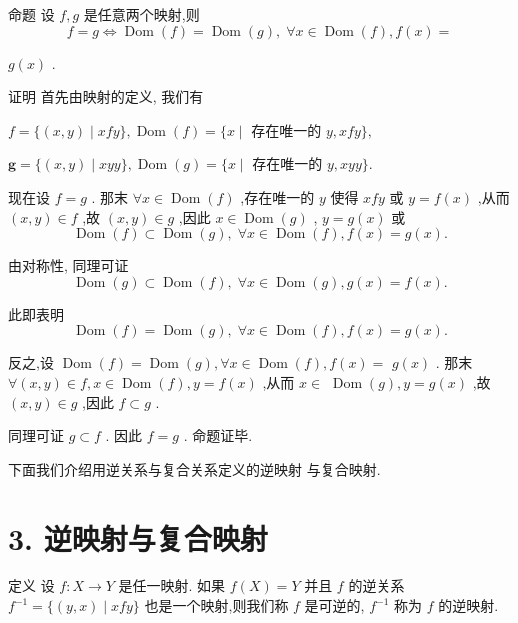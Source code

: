 命题 设 $f,g$ 是任意两个映射,则
$$f = g \Leftrightarrow  \operatorname{Dom}\left( f\right)  = \operatorname{Dom}\left( g\right) ,\;\forall x \in  \operatorname{Dom}\left( f\right) ,f\left( x\right)  =$$

$g\left( x\right)$ .

证明 首先由映射的定义, 我们有

$f = \{ \left( {x,y}\right)  \mid  {xfy}\} ,\operatorname{Dom}\left( f\right)  = \{ x \mid$ 存在唯一的 $y,{xfy}\} ,$

$\mathbf{g} = \{ \left( {x,y}\right)  \mid  {xyy}\} ,\operatorname{Dom}\left( g\right)  = \{ x \mid$ 存在唯一的 $y,{xyy}\} .$

现在设 $f = g$ . 那末 $\forall x \in  \operatorname{Dom}\left( f\right)$ ,存在唯一的 $y$ 使得 ${xfy}$ 或 $y = f\left( x\right)$ ,从而 $\left( {x,y}\right)  \in  f$ ,故 $\left( {x,y}\right)  \in  g$ ,因此 $x \in  \operatorname{Dom}\left( g\right)$ , $y = g\left( x\right)$ 或
$$\operatorname{Dom}\left( f\right)  \subset  \operatorname{Dom}\left( g\right) ,\;\forall x \in  \operatorname{Dom}\left( f\right) ,f\left( x\right)  = g\left( x\right) .$$

由对称性, 同理可证
$$\operatorname{Dom}\left( g\right)  \subset  \operatorname{Dom}\left( f\right) ,\;\forall x \in  \operatorname{Dom}\left( g\right) ,g\left( x\right)  = f\left( x\right) .$$

此即表明
$$\operatorname{Dom}\left( f\right)  = \operatorname{Dom}\left( g\right) ,\;\forall x \in  \operatorname{Dom}\left( f\right) ,f\left( x\right)  = g\left( x\right) .$$

反之,设 $\operatorname{Dom}\left( f\right)  = \operatorname{Dom}\left( g\right) ,\forall x \in  \operatorname{Dom}\left( f\right) ,f\left( x\right)  =$  $g\left( x\right)$ . 那末 $\forall \left( {x,y}\right)  \in  f,x \in  \operatorname{Dom}\left( f\right) ,y = f\left( x\right)$ ,从而 $x \in$  $\operatorname{Dom}\left( g\right) ,y = g\left( x\right)$ ,故 $\left( {x,y}\right)  \in  g$ ,因此 $f \subset  g$ .

同理可证 $g \subset  f$ . 因此 $f = g$ . 命题证毕.

下面我们介绍用逆关系与复合关系定义的逆映射 与复合映射.

\section*{3. 逆映射与复合映射}

定义 设 $f : X \rightarrow  Y$ 是任一映射. 如果 $f\left( X\right)  = Y$ 并且 $f$ 的逆关系 ${f}^{-1} = \{ \left( {y,x}\right)  \mid  {xfy}\}$ 也是一个映射,则我们称 $f$ 是可逆的, ${f}^{-1}$ 称为 $f$ 的逆映射.

